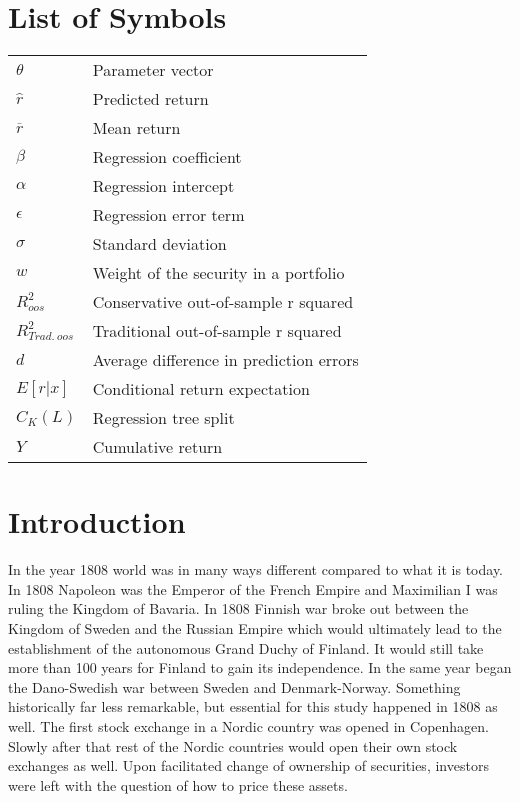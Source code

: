 \documentclass[12pt]{article}
\begin{document}
\newpage

\section*{List of Symbols}
\begin{tabular}{l l}
$\theta$ & Parameter vector\\
$\hat{r}$ & Predicted return\\
$\overline{r}$ & Mean return\\
$\beta$ & Regression coefficient \\
$\alpha$ & Regression intercept\\
$\epsilon$ & Regression error term\\
$\sigma$ & Standard deviation\\
$w$ & Weight of the security in a portfolio\\
$R^2_{oos}$ & Conservative out-of-sample r squared \\
$R^2_{Trad. \ oos}$ & Traditional out-of-sample r squared \\
$d$ & Average difference in prediction errors \\
$E \left[ r | x \right] $ & Conditional return expectation \\
$C_K(L)$ & Regression tree split \\
$Y$ & Cumulative return\\
\end{tabular}

\newpage

\section{Introduction} \label{Introduction}
In the year 1808 world was in many ways different compared to what it is today. In 1808 Napoleon was the Emperor of the French Empire and Maximilian I was ruling the Kingdom of Bavaria. In 1808 Finnish war broke out between the Kingdom of Sweden and the Russian Empire which would ultimately lead to the establishment of the autonomous Grand Duchy of Finland. It would still take more than 100 years for Finland to gain its independence. In the same year began the Dano-Swedish war between Sweden and Denmark-Norway. Something historically far less remarkable, but essential for this study happened in 1808 as well. The first stock exchange in a Nordic country was opened in Copenhagen\footnotemark. Slowly after that rest of the Nordic countries would open their own stock exchanges as well. Upon facilitated change of ownership of securities, investors were left with the question of how to price these assets. \par
\end{document}
